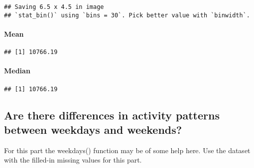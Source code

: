 \documentclass[]{article}
\newenvironment{Shaded}{\begin{snugshade}}{\end{snugshade}}
\newcommand{\DataTypeTok}[1]{\textcolor[rgb]{0.13,0.29,0.53}{#1}}
\newcommand{\KeywordTok}[1]{\textcolor[rgb]{0.13,0.29,0.53}{\textbf{#1}}}
\newcommand{\NormalTok}[1]{#1}
\newcommand{\OperatorTok}[1]{\textcolor[rgb]{0.81,0.36,0.00}{\textbf{#1}}}
\newcommand{\StringTok}[1]{\textcolor[rgb]{0.31,0.60,0.02}{#1}}
\let\oldparagraph\paragraph
\renewcommand{\paragraph}[1]{\oldparagraph{#1}\mbox{}}
\begin{document}
\begin{verbatim}
## Saving 6.5 x 4.5 in image
## `stat_bin()` using `bins = 30`. Pick better value with `binwidth`.
\end{verbatim}

\hypertarget{mean-1}{%
\paragraph{Mean}\label{mean-1}}

\begin{Shaded}
\end{Shaded}

\begin{verbatim}
## [1] 10766.19
\end{verbatim}

\hypertarget{median-1}{%
\paragraph{Median}\label{median-1}}

\begin{Shaded}
\end{Shaded}

\begin{verbatim}
## [1] 10766.19
\end{verbatim}

\hypertarget{are-there-differences-in-activity-patterns-between-weekdays-and-weekends}{%
\subsection{Are there differences in activity patterns between weekdays
and
weekends?}\label{are-there-differences-in-activity-patterns-between-weekdays-and-weekends}}

For this part the \color{red}{\verb|weekdays()|}weekdays() function may
be of some help here. Use the dataset with the filled-in missing values
for this part.
\end{document}
